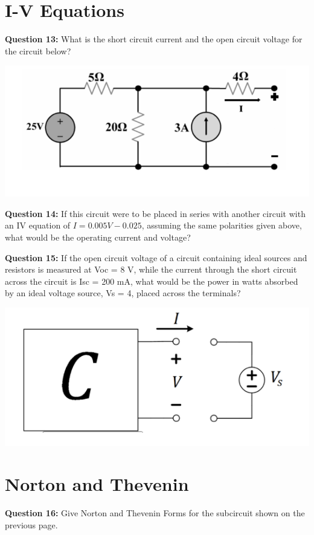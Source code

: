 \documentclass{article}
\begin{document}
\pagebreak

\section*{I-V Equations}
\textbf{Question 13:} What is the short circuit current and the open circuit voltage for the circuit below?
\begin{center}

        \includegraphics[width=0.75\linewidth]{figures/12.png}

\end{center}

\textbf{Question 14:} If this circuit were to be placed in series with another circuit with an IV equation of \(I = 0.005V - 0.025\), assuming the same polarities given above, what would be the operating current and voltage?

\textbf{Question 15:} If the open circuit voltage of a circuit containing ideal sources and resistors is measured at Voc = 8 V, while the current through the short circuit across the circuit is Isc = 200 mA, what would be the power in watts absorbed by an ideal voltage source, Vs = 4, placed across the terminals?

\begin{center}
    \includegraphics[width=0.75\linewidth]{figures/14.png}

\end{center}

\section*{Norton and Thevenin}
\textbf{Question 16:} Give Norton and Thevenin Forms for the subcircuit shown on the previous page.
\end{document}
